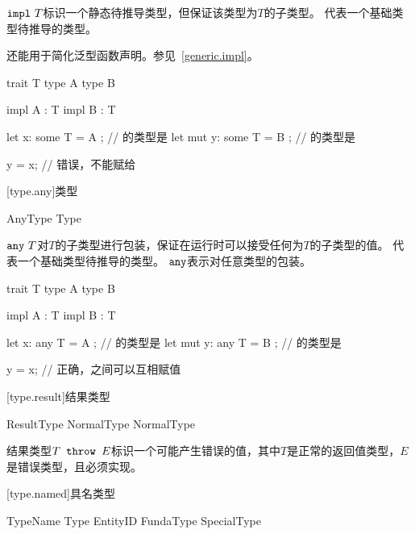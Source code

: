 \pnum
$\tcode{impl}\ T$标识一个静态待推导类型，但保证该类型为$T$的子类型。
代表一个基础类型待推导的类型。

\pnum
{}还能用于简化泛型函数声明。参见~\ref{generic.impl}。

\enterexample
\begin{codeblock}

trait T { }
type A { }
type B { }

impl A : T { }
impl B : T { }

let x: some T = A { }; // 的类型是
let mut y: some T = B { }; // 的类型是

y = x; // 错误，不能赋给

\end{codeblock}
\exitexample

[type.any]{类型}

\begin{bnf}{AnyType}
     Type \br
     \terminal{_} \br
\end{bnf}

\pnum
$\tcode{any}\ T$对$T$的子类型进行包装，保证在运行时可以接受任何为$T$的子类型的值。
代表一个基础类型待推导的类型。
$\texttt{any}$表示对任意类型的包装。

\enterexample
\begin{codeblock}

trait T { }
type A { }
type B { }

impl A : T { }
impl B : T { }

let x: any T = A { }; // 的类型是
let mut y: any T = B { }; // 的类型是

y = x; // 正确，之间可以互相赋值

\end{codeblock}
\exitexample

[type.result]{结果类型}

\begin{bnf}{ResultType}
    NormalType  NormalType
\end{bnf}

\pnum
结果类型$T\texttt{ throw }E$标识一个可能产生错误的值，其中$T$是正常的返回值类型，$E$是错误类型，且必须实现。

[type.named]{具名类型}

\begin{bnf}{TypeName}
    \terminal{(} Type \terminal{)} \br
    EntityID \br
    FundaType \br
    SpecialType
\end{bnf}

